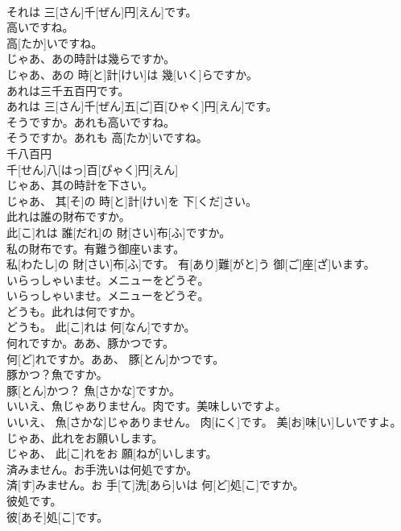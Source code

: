 \documentclass[8pt]{extreport}
\begin{document}
\begin{CJK}{UTF8}{min}
\\	それは 三[さん]千[ぜん]円[えん]です。
\\	高いですね。	
\\	高[たか]いですね。
\\	じゃあ、あの時計は幾らですか。	
\\	じゃあ、あの 時[と]計[けい]は 幾[いく]らですか。
\\	あれは三千五百円です。	
\\	あれは 三[さん]千[ぜん]五[ご]百[ひゃく]円[えん]です。
\\	そうですか。あれも高いですね。	
\\	そうですか。あれも 高[たか]いですね。
\\	千八百円	
\\	千[せん]八[はっ]百[ぴゃく]円[えん]	
\\	じゃあ、其の時計を下さい。	
\\	じゃあ、 其[そ]の 時[と]計[けい]を 下[くだ]さい。
\\	此れは誰の財布ですか。	
\\	此[こ]れは 誰[だれ]の 財[さい]布[ふ]ですか。
\\	私の財布です。有難う御座います。	
\\	私[わたし]の 財[さい]布[ふ]です。 有[あり]難[がと]う 御[ご]座[ざ]います。
\\	いらっしゃいませ。メニューをどうぞ。	
\\	いらっしゃいませ。メニューをどうぞ。
\\	どうも。此れは何ですか。	
\\	どうも。 此[こ]れは 何[なん]ですか。
\\	何れですか。ああ、豚かつです。	
\\	何[ど]れですか。ああ、 豚[とん]かつです。
\\	豚かつ？魚ですか。	
\\	豚[とん]かつ？ 魚[さかな]ですか。
\\	いいえ、魚じゃありません。肉です。美味しいですよ。	
\\	いいえ、 魚[さかな]じゃありません。 肉[にく]です。 美[お]味[い]しいですよ。
\\	じゃあ、此れをお願いします。	
\\	じゃあ、 此[こ]れをお 願[ねが]いします。
\\	済みません。お手洗いは何処ですか。	
\\	済[す]みません。お 手[て]洗[あら]いは 何[ど]処[こ]ですか。
\\	彼処です。	
\\	彼[あそ]処[こ]です。

\end{CJK}
\end{document}
